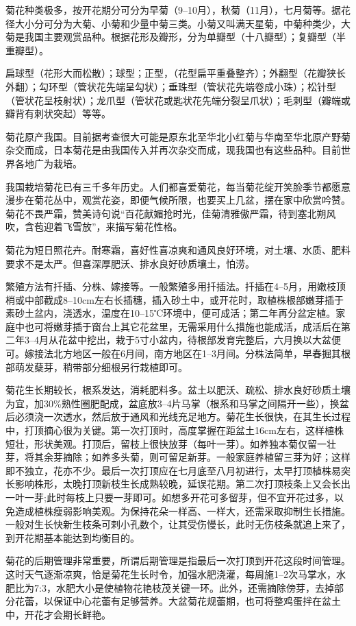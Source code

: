 \documentclass{ctexbook}
\begin{document}
菊花种类极多，按开花期分可分为早菊（9--10月），秋菊（11月），七月菊等。据花径大小分可分为大菊、小菊和少量中菊三类。小菊又叫满天星菊，中菊种类少，大菊是我国主要观赏品种。根据花形及瓣形，分为单瓣型（十八瓣型）；复瓣型（半重瓣型）。

扁球型（花形大而松散）；球型；正型，（花型扁平重叠整齐）；外翻型（花瓣狭长外翻）；勾环型（管状花先端呈勾状）；垂珠型（管状花先端卷成小珠）；松针型（管状花呈枝射状）；龙爪型（管状花或匙状花先端分裂呈爪状）；毛刺型（瓣端或瓣背有刺状突起）等等。

菊花原产我国。目前据考查很大可能是原东北至华北小红菊与华南至华北原产野菊杂交而成，日本菊花是由我国传入并再次杂交而成，现我国也有这些品种。目前世界各地广为栽培。

我国栽培菊花已有三千多年历史。人们都喜爱菊花，每当菊花绽开笑脸季节都愿意漫步在菊花丛中，观赏花姿，即便气候所限，也要买上几盆，摆在家中欣赏吟赞。菊花不畏严霜，赞美诗句说“百花献媚抢时光，佳菊清雅傲严霜，待到塞北朔风吹，含苞迎着飞雪放”，来描写菊花性格。

菊花为短日照花卉。耐寒霜，喜好性喜凉爽和通风良好环境，对土壤、水质、肥料要求不是太严。但喜深厚肥沃、排水良好砂质壤土，怕涝。

繁殖方法有扦插、分株、嫁接等。一般繁殖多用扦插法。扦插在4--5月，用嫩枝顶梢或中部截成8--10cm左右长插穗，插入砂土中，或开花时，取植株根部嫩芽插于素砂土盆内，浇透水，温度在10--15℃环境中，便可成活；第二年再分盆定植。家庭中也可将嫩芽插于窗台上其它花盆里，无需采用什么措施也能成活，成活后在第二年3--4月从花盆中挖出，栽于5寸小盆内，待根部发育完整后，六月换以大盆便可。嫁接法北方地区一般在6月间，南方地区在1--3月间。分株法简单，早春掘其根部萌发蘖芽，稍带部分细根另行栽植即可。

菊花生长期较长，根系发达，消耗肥料多。盆土以肥沃、疏松、排水良好砂质土壤为宜，加30\%熟性圈肥配成，盆底放3--4片马掌（根系和马掌之间隔开一些），换盆后必须浇一次透水，然后放于通风和光线充足地方。菊花生长很快，在其生长过程中，打顶摘心很为关键。第一次打顶时，高度掌握在距盆土16cm左右，这样植株短壮，形状美观。打顶后，留枝上很快放芽（每叶一芽）。如养独本菊仅留一壮芽，将其余芽摘除；如养多头菊，则可留足新芽。一般家庭养植留三芽为好；这样即不独立，花亦不少。最后一次打顶应在七月底至八月初进行，太早打顶植株易突长影响株形，太晚打顶新枝生长成熟较晚，延误花期。第二次打顶枝条上又会长出一叶一芽;此时每枝上只要一芽即可。如想多开花可多留芽，但不宜开花过多，以免造成植株瘦弱影响美观。为保持花朵一样高、一样大，还需采取抑制生长措施。一般对生长快新生枝条可剌小孔数个，让其受伤慢长，此时无伤枝条就追上来了，到开花期基本能达到均衡目的。

菊花的后期管理非常重要，所谓后期管理是指最后一次打顶到开花这段时间管理。这时天气逐渐凉爽，恰是菊花生长时令，加强水肥浇灌，每周施1--2次马掌水，水肥比为7:3，水肥大小是使植物花艳枝茂关键一环。此外，还需摘除傍芽，去掉部分花蕾，以保证中心花蕾有足够营养。大盆菊花规蕾期，也可将整鸡蛋拌在盆土中，开花才会期长鲜艳。
\end{document}
